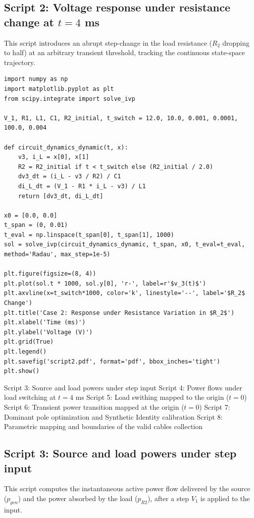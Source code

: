 \documentclass[11pt, a4paper]{article}
\begin{document}
\subsection*{Script 2: Voltage response under resistance change at $t=4$ ms}
This script introduces an abrupt step-change in the load resistance ($R_2$ dropping to half) at an arbitrary transient threshold, tracking the continuous state-space trajectory.

{\footnotesize
\begin{verbatim}
import numpy as np
import matplotlib.pyplot as plt
from scipy.integrate import solve_ivp

V_1, R1, L1, C1, R2_initial, t_switch = 12.0, 10.0, 0.001, 0.0001, 100.0, 0.004

def circuit_dynamics_dynamic(t, x):
    v3, i_L = x[0], x[1]
    R2 = R2_initial if t < t_switch else (R2_initial / 2.0)
    dv3_dt = (i_L - v3 / R2) / C1
    di_L_dt = (V_1 - R1 * i_L - v3) / L1
    return [dv3_dt, di_L_dt]

x0 = [0.0, 0.0]
t_span = (0, 0.01)
t_eval = np.linspace(t_span[0], t_span[1], 1000)
sol = solve_ivp(circuit_dynamics_dynamic, t_span, x0, t_eval=t_eval, method='Radau', max_step=1e-5)

plt.figure(figsize=(8, 4))
plt.plot(sol.t * 1000, sol.y[0], 'r-', label=r'$v_3(t)$')
plt.axvline(x=t_switch*1000, color='k', linestyle='--', label='$R_2$ Change')
plt.title('Case 2: Response under Resistance Variation in $R_2$')
plt.xlabel('Time (ms)')
plt.ylabel('Voltage (V)')
plt.grid(True)
plt.legend()
plt.savefig('script2.pdf', format='pdf', bbox_inches='tight')
plt.show()
\end{verbatim}
}


Script 3: Source and load powers under step input
Script 4: Power flows under load switching at $t=4$ ms
Script 5: Load swithing mapped to the origin ($t=0$)
Script 6: Transient power transition mapped at the origin ($t=0$)
Script 7: Dominant pole optimization and Synthetic Identity calibration
Script 8: Parametric mapping and boundaries of the valid cables collection

\subsection*{Script 3: Source and load powers under step input}
This script computes the instantaneous active power flow delivered by the source ($p_{gen}$) and the power absorbed by the load ($p_{R2}$), after a step $V_1$ is applied to the input.
\end{document}
